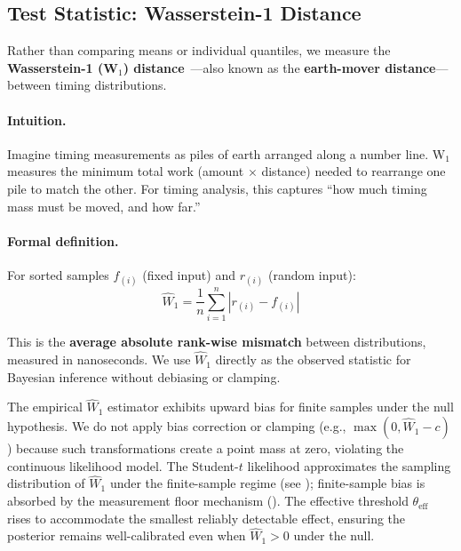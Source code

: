 \documentclass[letterpaper,twocolumn,10pt]{article}
\begin{document}
\subsection{Test Statistic: Wasserstein-1 Distance}
\label{sec:approach:wasserstein}

Rather than comparing means or individual quantiles, we measure the \textbf{Wasserstein-1 (W$_1$)
distance}~\cite{villani2009}---also known as the \textbf{earth-mover distance}---between timing distributions.

\paragraph{Intuition.}
Imagine timing measurements as piles of earth arranged along a number line. W$_1$ measures
the minimum total work (amount $\times$ distance) needed to rearrange one pile to match
the other. For timing analysis, this captures ``how much timing mass must be moved, and how far.''

\paragraph{Formal definition.}
For sorted samples $f_{(i)}$ (fixed input) and $r_{(i)}$ (random input):
\begin{equation}
    \widehat{W}_1 = \frac{1}{n}\sum_{i=1}^{n} \left| r_{(i)} - f_{(i)} \right|
\end{equation}

This is the \textbf{average absolute rank-wise mismatch} between distributions, measured
in nanoseconds. We use $\widehat{W}_1$ directly as the observed statistic for Bayesian
inference without debiasing or clamping.

The empirical $\widehat{W}_1$ estimator exhibits upward bias for finite samples under the
null hypothesis. We do not apply bias correction or clamping (e.g., $\max(0, \widehat{W}_1 - c)$)
because such transformations create a point mass at zero, violating the continuous likelihood
model. The Student-$t$ likelihood approximates the sampling distribution of $\widehat{W}_1$
under the finite-sample regime (see ); finite-sample bias is
absorbed by the measurement floor mechanism (). The effective
threshold $\theta_{\text{eff}}$ rises to accommodate the smallest reliably detectable effect,
ensuring the posterior remains well-calibrated even when $\widehat{W}_1 > 0$ under the null.
\end{document}
